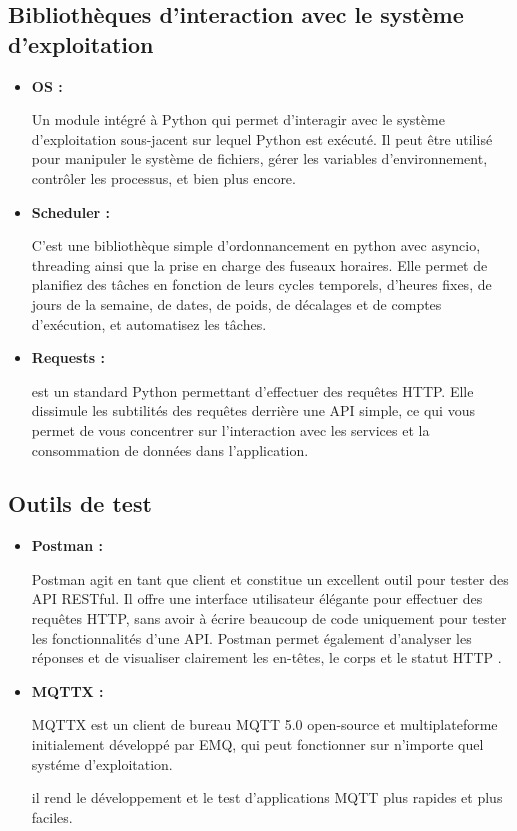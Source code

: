 \subsection{Bibliothèques d'interaction avec le système d'exploitation}
\begin{itemize}
    \item\textbf{OS : }
        \par Un module intégré à Python qui permet d'interagir avec le système d'exploitation sous-jacent sur lequel Python est exécuté. 
        Il peut être utilisé pour manipuler le système de fichiers, gérer les variables d'environnement, contrôler les processus, et bien plus encore\cite{os}.

    \item \textbf{Scheduler : }
        \par C'est une bibliothèque simple d'ordonnancement en python avec asyncio, threading ainsi que la prise en charge des fuseaux horaires.
         Elle permet de planifiez des tâches en fonction de leurs cycles temporels, d'heures fixes, de jours de la semaine,
         de dates, de poids, de décalages et de comptes d'exécution, et automatisez les tâches\cite{scheduler}.
    \item \textbf{Requests : }
        \par est un standard Python permettant d'effectuer des requêtes HTTP.
         Elle dissimule les subtilités des requêtes derrière une API simple, ce qui vous permet de vous concentrer sur l'interaction avec les services et la consommation de données dans l'application\cite{requests}.
    
\end{itemize}
\subsection{Outils de test}
\begin{itemize}
    \item \textbf{Postman : }
                \par  Postman agit en tant que client et constitue un excellent outil pour tester des API RESTful. Il offre une interface utilisateur élégante pour effectuer des requêtes HTTP,
                 sans avoir à écrire beaucoup de code uniquement pour tester les fonctionnalités d'une API. 
                 Postman permet également d'analyser les réponses et de visualiser clairement les en-têtes, le corps et le statut HTTP \cite{postman}. 
    \item\textbf{MQTTX :}
            \par MQTTX est un client de bureau MQTT 5.0 open-source et multiplateforme initialement développé par EMQ, qui peut fonctionner sur n'importe quel systéme d'exploitation.
            \par il rend le développement et le test d'applications MQTT plus rapides et plus faciles\cite{mqttx}.
    \end{itemize}
    \newpage
